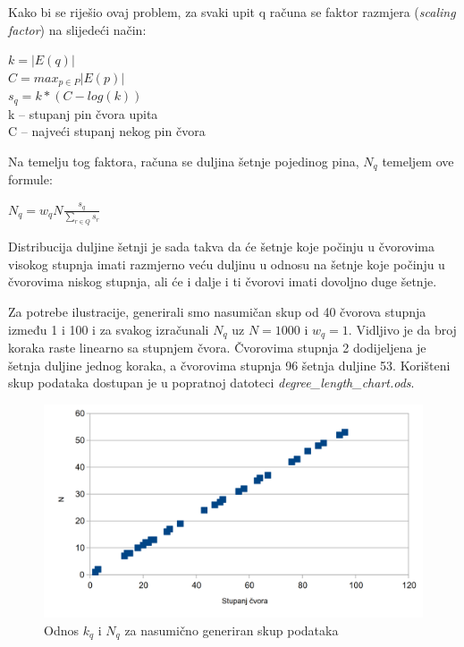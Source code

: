 \documentclass[times, utf8, seminar]{fer}
\begin{document}
Kako bi se riješio ovaj problem, za svaki upit q računa se faktor razmjera (\textit{scaling factor}) na slijedeći način:

\begin{centering}
		  $ k = |E(q)| $ \\
		  $ C = max_{p \in P}|E(p)| $ \\
		  $ s_q = k * (C - log(k)) $ \\
        k -- stupanj pin čvora upita \\
		  C -- najveći stupanj nekog pin čvora 
		  \par
\end{centering}

Na temelju tog faktora, računa se duljina šetnje pojedinog pina, $N_q$ temeljem ove formule:

\begin{centering}
	$ N_q = w_qN\frac{s_q}{\sum_{r \in Q}s_r} $\par
\end{centering}

Distribucija duljine šetnji je sada takva da će šetnje koje počinju u čvorovima visokog stupnja imati razmjerno veću duljinu u odnosu na šetnje koje počinju u čvorovima niskog stupnja, ali će i dalje i ti čvorovi imati dovoljno duge šetnje.

Za potrebe ilustracije, generirali smo nasumičan skup od 40 čvorova stupnja između 1 i 100 i za svakog izračunali $N_q$ uz $N = 1000$ i $w_q = 1$. Vidljivo je da broj koraka raste linearno sa stupnjem čvora. Čvorovima stupnja 2 dodijeljena je šetnja duljine jednog koraka, a čvorovima stupnja 96 šetnja duljine 53. Korišteni skup podataka dostupan je u popratnoj datoteci \textit{degree\_length\_chart.ods}.

\begin{figure}[h]
	\centering
	\includegraphics[width=\textwidth]{degree_chart}
	\caption{Odnos $k_q$ i $N_q$ za nasumično generiran skup podataka}
	\label{fig:pins_boards}
\end{figure}
\end{document}
